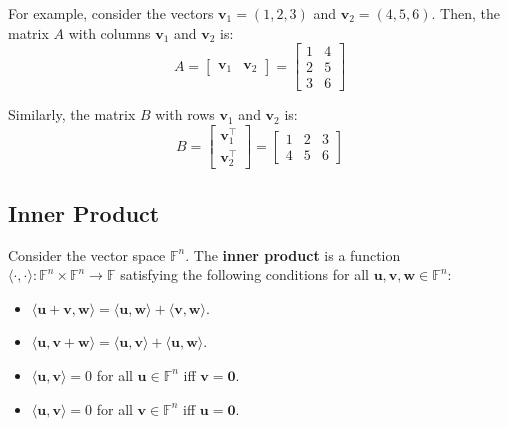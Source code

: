 \documentclass[../lecture-notes-148x210.tex]{subfiles}
\begin{document}
\begin{example}
    For example, consider the vectors $\mathbf{v}_1 = (1,2,3)$ and $\mathbf{v}_2 = (4,5,6)$. Then, the matrix $A$ with columns $\mathbf{v}_1$ and $\mathbf{v}_2$ is:
    \begin{equation*}
        A = \begin{bmatrix}
            \mathbf{v}_1 & \mathbf{v}_2
        \end{bmatrix} = \begin{bmatrix}
            1 & 4 \\
            2 & 5 \\
            3 & 6
        \end{bmatrix}
    \end{equation*}

    Similarly, the matrix $B$ with rows $\mathbf{v}_1$ and $\mathbf{v}_2$ is:
    \begin{equation*}
        B = \begin{bmatrix}
            \mathbf{v}_1^{\top} \\ \mathbf{v}_2^{\top}
        \end{bmatrix} = \begin{bmatrix}
            1 & 2 & 3 \\
            4 & 5 & 6
        \end{bmatrix}
    \end{equation*}
\end{example}

\subsection{Inner Product}

\begin{definition}
    Consider the vector space $\mathbb{F}^n$. The \textbf{inner product} is a function $\langle \cdot, \cdot \rangle: \mathbb{F}^n \times \mathbb{F}^n \to \mathbb{F}$ satisfying the following conditions for all $\mathbf{u},\mathbf{v},\mathbf{w} \in \mathbb{F}^n$:
    \begin{itemize}
        \item $\langle \mathbf{u} + \mathbf{v}, \mathbf{w} \rangle = \langle \mathbf{u}, \mathbf{w} \rangle + \langle \mathbf{v}, \mathbf{w} \rangle$.
        \item $\langle \mathbf{u}, \mathbf{v} + \mathbf{w} \rangle = \langle \mathbf{u}, \mathbf{v} \rangle + \langle \mathbf{u}, \mathbf{w} \rangle$.
        \item $\langle \mathbf{u}, \mathbf{v} \rangle = 0$ for all $\mathbf{u} \in \mathbb{F}^n$ iff $\mathbf{v} = \mathbf{0}$.
        \item $\langle \mathbf{u}, \mathbf{v} \rangle = 0$ for all $\mathbf{v} \in \mathbb{F}^n$ iff $\mathbf{u} = \mathbf{0}$.
    \end{itemize}
\end{definition}
\end{document}
